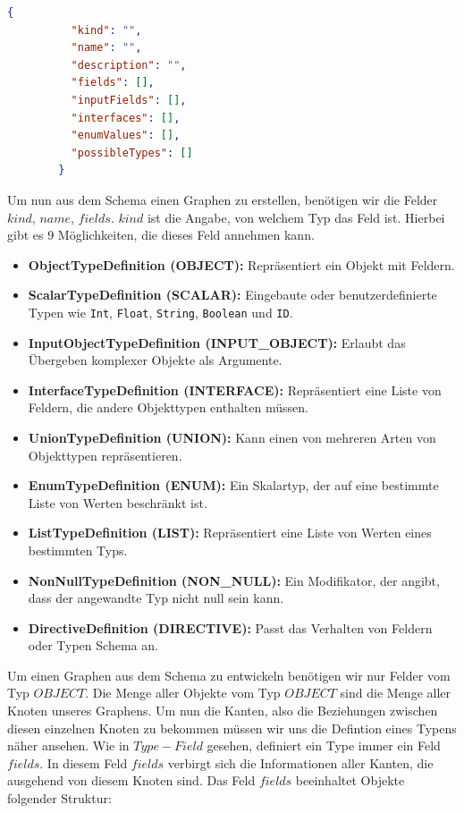 \begin{lstlisting}[language=json, caption={Type-Field},captionpos=b]
        {
          "kind": "",
          "name": "",
          "description": "",
          "fields": [],
          "inputFields": [],
          "interfaces": [],
          "enumValues": [],
          "possibleTypes": []
        }
\end{lstlisting}

Um nun aus dem Schema einen Graphen zu erstellen, benötigen wir die Felder $kind$, $name$, $fields$.
$kind$ ist die Angabe, von welchem Typ das Feld ist.
Hierbei gibt es 9 Möglichkeiten, die dieses Feld annehmen kann.

\begin{itemize}
    \item \textbf{ObjectTypeDefinition (OBJECT):} Repräsentiert ein Objekt mit Feldern.
    \item \textbf{ScalarTypeDefinition (SCALAR):} Eingebaute oder benutzerdefinierte Typen wie \texttt{Int}, \texttt{Float}, \texttt{String}, \texttt{Boolean} und \texttt{ID}.
    \item \textbf{InputObjectTypeDefinition (INPUT\_OBJECT):} Erlaubt das Übergeben komplexer Objekte als Argumente.
    \item \textbf{InterfaceTypeDefinition (INTERFACE):} Repräsentiert eine Liste von Feldern, die andere Objekttypen enthalten müssen.
    \item \textbf{UnionTypeDefinition (UNION):} Kann einen von mehreren Arten von Objekttypen repräsentieren.
    \item \textbf{EnumTypeDefinition (ENUM):} Ein Skalartyp, der auf eine bestimmte Liste von Werten beschränkt ist.
    \item \textbf{ListTypeDefinition (LIST):} Repräsentiert eine Liste von Werten eines bestimmten Typs.
    \item \textbf{NonNullTypeDefinition (NON\_NULL):} Ein Modifikator, der angibt, dass der angewandte Typ nicht null sein kann.
    \item \textbf{DirectiveDefinition (DIRECTIVE):} Passt das Verhalten von Feldern oder Typen  Schema an.
\end{itemize}

Um einen Graphen aus dem Schema zu entwickeln benötigen wir nur Felder vom Typ $OBJECT$.
Die Menge aller Objekte vom Typ $OBJECT$ sind die Menge aller Knoten unseres Graphens.
Um nun die Kanten, also die Beziehungen zwischen diesen einzelnen Knoten zu bekommen müssen wir uns die Defintion
eines Typens näher ansehen.
Wie in $Type-Field$ gesehen, definiert ein Type immer ein Feld $fields$.
In diesem Feld $fields$ verbirgt sich die Informationen aller Kanten, die ausgehend von diesem Knoten sind.
Das Feld $fields$ beeinhaltet Objekte folgender Struktur:

